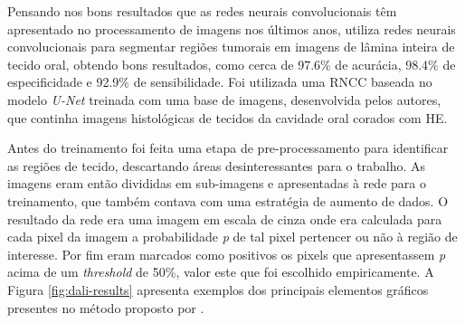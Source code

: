 Pensando nos bons resultados que as redes neurais convolucionais têm apresentado no processamento de imagens nos últimos anos, \cite{Santos2021} utiliza redes neurais convolucionais para segmentar regiões tumorais em imagens de lâmina inteira de tecido oral, obtendo bons resultados, como cerca de 97.6\% de acurácia, 98.4\% de especificidade e 92.9\% de sensibilidade. Foi utilizada uma \ac{RNCC} baseada no modelo \textit{U-Net} treinada com uma base de imagens, desenvolvida pelos autores, que continha imagens histológicas de tecidos da cavidade oral corados com \ac{HE}.

Antes do treinamento foi feita uma etapa de pre-processamento para identificar as regiões de tecido, descartando áreas desinteressantes para o trabalho.
As imagens eram então divididas em sub-imagens e apresentadas à rede para o treinamento, que também contava com uma estratégia de aumento de dados. 
O resultado da rede era uma imagem em escala de cinza onde era calculada para cada pixel da imagem a probabilidade \textit{p} de tal pixel pertencer ou não à região de interesse. Por fim eram marcados como positivos os pixels que apresentassem \textit{p} acima de um \textit{threshold} de 50\%, valor este que foi escolhido empiricamente. A Figura \ref{fig:dali-results} apresenta exemplos dos principais elementos gráficos presentes no método proposto por \cite{santos2022automated}.

